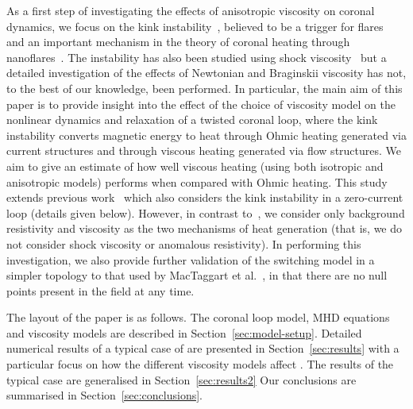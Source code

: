 As a first step of investigating the effects of anisotropic viscosity on coronal dynamics, we focus on the kink instability~\cite{hoodKinkInstabilitySolar1979, hoodCoronalHeatingMagnetic2009}, believed to be a trigger for flares~\cite{srivastavaOBSERVATIONKINKINSTABILITY2010} and an important mechanism in the theory of coronal heating through nanoflares~\cite{browningHeatingCoronaNanoflares2008a}. The instability has also been studied using shock viscosity~\cite{hoodCoronalHeatingMagnetic2009,barefordShockHeatingNumerical2015} but a detailed investigation of the effects of Newtonian and Braginskii viscosity has not, to the best of our knowledge, been performed.
In particular, the main aim of this paper is to provide insight into the effect of the choice of viscosity model on the nonlinear dynamics and relaxation of a twisted coronal loop, where the kink instability converts magnetic energy to heat through Ohmic heating generated via current structures and through viscous heating generated via flow structures. We aim to give an estimate of how well viscous heating (using both isotropic and anisotropic models) performs when compared with Ohmic heating. This study extends previous work~\cite{hoodCoronalHeatingMagnetic2009} which also considers the kink instability in a zero-current loop (details given below). However, in contrast to~\cite{hoodCoronalHeatingMagnetic2009}, we consider only background resistivity and viscosity as the two mechanisms of heat generation (that is, we do not consider shock viscosity or anomalous resistivity). In performing this investigation, we also provide further validation of the switching model in a simpler topology to that used by MacTaggart et al.~\cite{mactaggartBraginskiiMagnetohydrodynamicsArbitrary2017}, in that there are no null points present in the field at any time.

The layout of the paper is as follows. The coronal loop model, MHD
equations and viscosity models are described in
Section~\ref{sec:model-setup}.  Detailed numerical
results of a typical case of  are presented in
Section~\ref{sec:results} with a particular focus on how the different
viscosity models affect . The results of
the typical case are  generalised  in Section~\ref{sec:results2}  Our conclusions are summarised in Section~\ref{sec:conclusions}.

